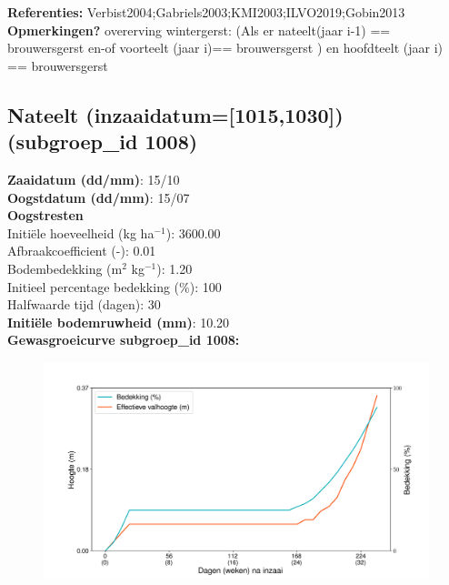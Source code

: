 \documentclass{article}
\begin{document}
  \textbf{Referenties:} Verbist2004;Gabriels2003;KMI2003;ILVO2019;Gobin2013 \vspace{0.10cm} \\ 
  \textbf{Opmerkingen?} overerving wintergerst: (Als er nateelt(jaar i-1) == brouwersgerst en-of voorteelt (jaar i)== brouwersgerst ) en hoofdteelt (jaar i) == brouwersgerst \vspace{0.10cm} \\ 
 \newpage 
 \subsection{Nateelt (inzaaidatum=[1015,1030]) (subgroep\_id 1008)} 
  \textbf{Zaaidatum (dd/mm)}: 15/10  \vspace{0.10cm} \\ 
  \textbf{Oogstdatum (dd/mm)}: 15/07  \vspace{0.10cm} \\ 
  \textbf{Oogstresten} \vspace{0.05cm} \\ 
  \tab Initi\"{e}le hoeveelheid (kg ha$^{-1}$): 3600.00 \vspace{0.05cm} \\ 
  \tab Afbraakcoefficient (-): 0.01 \vspace{0.05cm} \\ 
  \tab Bodembedekking (m$^2$ kg$^{-1}$): 1.20 \vspace{0.05cm} \\ 
  \tab Initieel percentage bedekking (\%): 100 \vspace{0.05cm} \\ 
  \tab Halfwaarde tijd (dagen): 30 \vspace{0.05cm} \\ 
  \textbf{Initi\"{e}le bodemruwheid (mm)}: 10.20 \vspace{0.05cm} \\ 
  \textbf{Gewasgroeicurve subgroep\_id 1008:} 
 \begin{center} \begin{figure}[H] \includegraphics[width=12.5cm]{temp/1008.png} \end{figure} \end{center} 
\end{document}
